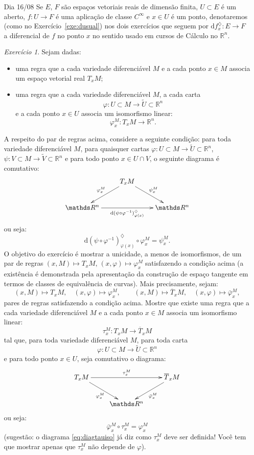 \documentclass[oneside,11pt]{amsart}
\newcommand{\R}{\mathds R}
\newcommand{\dd}{\mathrm d}
\theoremstyle{remark}\newtheorem{exercise}{Exercício}[section]
\theoremstyle{plain}\newtheorem{teo}{Teorema}[section]
\theoremstyle{plain}\newtheorem{lem}[teo]{Lema}
\theoremstyle{plain}\newtheorem{prop}[teo]{Proposição}
\theoremstyle{definition}\newtheorem{defin}[teo]{Definição}
\theoremstyle{remark}\newtheorem{rem}[teo]{Observação}
\theoremstyle{definition}\newtheorem{example}[teo]{Exemplo}
\numberwithin{equation}{section}
\begin{document}
\begin{section}{Dia 16/08}
Se $E$, $F$ são espaços vetoriais reais de dimensão finita, $U\subset E$ é um aberto, $f:U\to F$ é uma aplicação
de classe $C^\infty$ e $x\in U$ é um ponto, denotaremos (como no Exercício~\ref{exe:dusual}) nos dois
exercícios que seguem por $\dd f^\diamondsuit_x:E\to F$ a diferencial de $f$ no ponto $x$ no sentido usado em cursos de Cálculo no $\R^n$.
\begin{exercise}\label{exe:axesptan1}
Sejam dadas:
\begin{itemize}
\item uma regra que a cada variedade diferenciável $M$ e a cada ponto $x\in M$ associa um espaço vetorial real
$T_xM$;
\item uma regra que a cada variedade diferenciável $M$, a cada carta
\[\varphi:U\subset M\longrightarrow\widetilde U\subset\R^n\]
e a cada ponto $x\in U$ associa um isomorfismo linear:
\[\varphi^M_x:T_xM\longrightarrow\R^n.\]
\end{itemize}
A respeito do par de regras acima, considere a seguinte condição:
para toda variedade diferenciável $M$, para quaisquer cartas $\varphi:U\subset M\to\widetilde U\subset\R^n$,
$\psi:V\subset M\to\widetilde V\subset\R^n$ e para todo ponto $x\in U\cap V$, o seguinte diagrama é comutativo:
\begin{equation}\label{eq:phipsidif}
\vcenter{\xymatrix{%
&T_xM\ar[dl]_{\varphi^M_x}\ar[dr]^{\psi^M_x}\\
\R^n\ar[rr]_{\dd(\psi\circ\varphi^{-1})^\diamondsuit_{\varphi(x)}}&&\R^n}}
\end{equation}
ou seja:
\[\dd(\psi\circ\varphi^{-1})^\diamondsuit_{\varphi(x)}\circ\varphi^M_x=\psi^M_x.\]
O objetivo do exercício é mostrar a unicidade, a menos de isomorfismos, de um par de regras $(x,M)\mapsto T_xM$,
$(x,\varphi)\mapsto\varphi^M_x$ satisfazendo a condição acima (a existência é demonstrada pela apresentação
da construção de espaço tangente em termos de classes de equivalência de curvas). Mais precisamente, sejam:
\[(x,M)\longmapsto T_xM,\quad(x,\varphi)\longmapsto\varphi^M_x,\qquad
(x,M)\longmapsto\overline T_xM,\quad(x,\varphi)\longmapsto\bar\varphi^M_x,\]
pares de regras satisfazendo a condição acima. Mostre que existe uma regra que a cada variedade diferenciável
$M$ e a cada ponto $x\in M$ associa um isomorfismo linear:
\[\tau^M_x:T_xM\longrightarrow\overline T_xM\]
tal que, para toda variedade diferenciável $M$, para toda carta
\[\varphi:U\subset M\longrightarrow\widetilde U\subset\R^n\]
e para todo ponto $x\in U$, seja comutativo o diagrama:
\begin{equation}\label{eq:diagtauiso}
\vcenter{\xymatrix{%
T_xM\ar[dr]_{\varphi^M_x}\ar[rr]^{\tau^M_x}&&\overline T_xM\ar[dl]^{\bar\varphi^M_x}\\
&\R^n}}
\end{equation}
ou seja:
\[\bar\varphi^M_x\circ\tau^M_x=\varphi^M_x\]
(sugestão: o diagrama \eqref{eq:diagtauiso} já diz como $\tau^M_x$ deve ser definida! Você tem que mostrar
apenas que $\tau^M_x$ não depende de $\varphi$).
\end{exercise}


\end{section}
\end{document}
